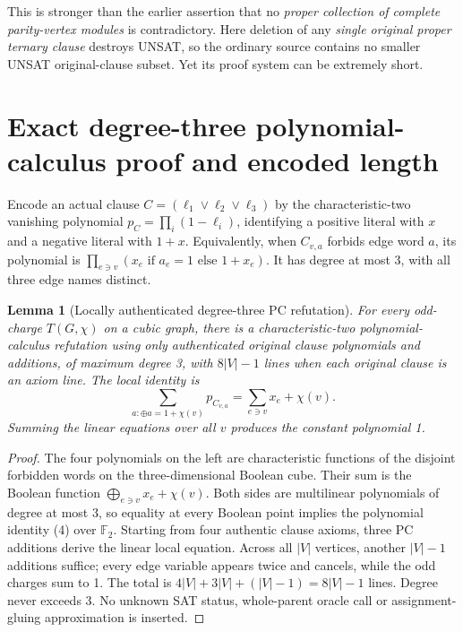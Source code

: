 \documentclass[11pt]{article}
\newtheorem{lemma}[theorem]{Lemma}
\begin{document}
This is stronger than the earlier assertion that no \emph{proper collection of complete parity-vertex modules} is contradictory.  Here deletion of any \emph{single original proper ternary clause} destroys UNSAT, so the ordinary source contains no smaller UNSAT original-clause subset.  Yet its proof system can be extremely short.

\section{Exact degree-three polynomial-calculus proof and encoded length}
Encode an actual clause $C=(\ell_1\vee\ell_2\vee\ell_3)$ by the characteristic-two vanishing polynomial $p_C=\prod_i(1-\ell_i)$, identifying a positive literal with $x$ and a negative literal with $1+x$.  Equivalently, when $C_{v,a}$ forbids edge word $a$, its polynomial is $\prod_{e\ni v}(x_e\text{ if }a_e=1\text{ else }1+x_e)$.  It has degree at most 3, with all three edge names distinct.
\begin{lemma}[Locally authenticated degree-three PC refutation]\label{lem:pc}
For every odd-charge $T(G,\chi)$ on a cubic graph, there is a characteristic-two polynomial-calculus refutation using only authenticated original clause polynomials and additions, of maximum degree 3, with $8|V|-1$ lines when each original clause is an axiom line.  The local identity is
\[
\boxed{\sum_{a:\oplus a=1+\chi(v)}p_{C_{v,a}}
=\sum_{e\ni v}x_e+\chi(v).}\tag{4}
\]
Summing the linear equations over all $v$ produces the constant polynomial 1.
\end{lemma}
\begin{proof}
The four polynomials on the left are characteristic functions of the disjoint forbidden words on the three-dimensional Boolean cube.  Their sum is the Boolean function $\bigoplus_{e\ni v}x_e+\chi(v)$.  Both sides are multilinear polynomials of degree at most 3, so equality at every Boolean point implies the polynomial identity (4) over $\mathbb F_2$.  Starting from four authentic clause axioms, three PC additions derive the linear local equation.  Across all $|V|$ vertices, another $|V|-1$ additions suffice; every edge variable appears twice and cancels, while the odd charges sum to 1.  The total is $4|V|+3|V|+(|V|-1)=8|V|-1$ lines.  Degree never exceeds 3.  No unknown SAT status, whole-parent oracle call or assignment-gluing approximation is inserted.
\end{proof}
\end{document}
